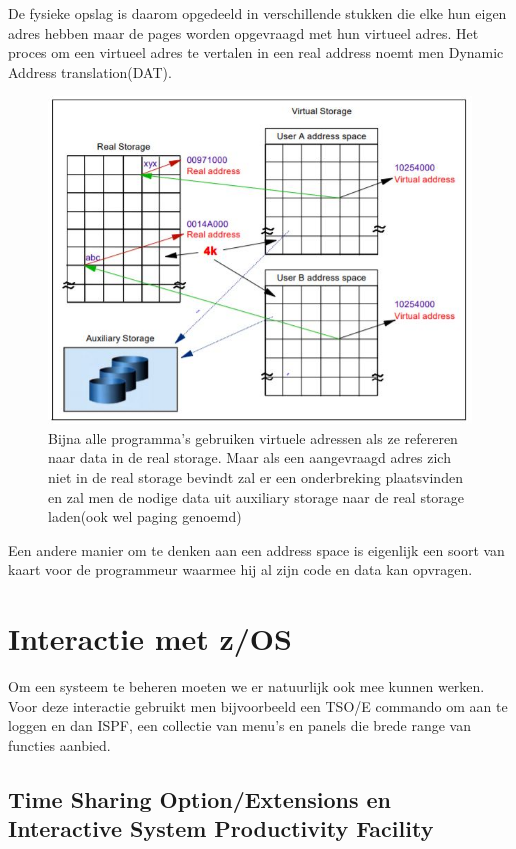 De fysieke opslag is daarom opgedeeld in verschillende stukken die elke hun eigen adres hebben maar de pages worden opgevraagd met hun virtueel adres. Het proces om een virtueel adres te vertalen in een real address noemt men Dynamic Address translation(DAT). \cite{Ebbers2011}

\begin{figure}[h]
	\centering
	\includegraphics{img/Storage}
	\caption[Visualisatie van het concept van virtuele storage]{Bijna alle programma's gebruiken virtuele adressen als ze refereren naar data in de real storage. Maar als een aangevraagd adres zich niet in de real storage bevindt zal er een onderbreking plaatsvinden en zal men de nodige data uit auxiliary storage naar de real storage laden(ook wel paging genoemd)}
	\label{fig:storage}
\end{figure}

Een andere manier om te denken aan een address space is eigenlijk een soort van kaart voor de programmeur waarmee hij al zijn code en data kan opvragen.

\section{Interactie met z/OS}
\label{sec:interactie met z/OS}

Om een systeem te beheren moeten we er natuurlijk ook mee kunnen werken. Voor deze interactie gebruikt men bijvoorbeeld een TSO/E commando om aan te loggen en dan ISPF, een collectie van menu's en panels die brede range van functies aanbied.

\subsection{Time Sharing Option/Extensions en Interactive System Productivity Facility}
\label{subsec:Time Sharing Option}

